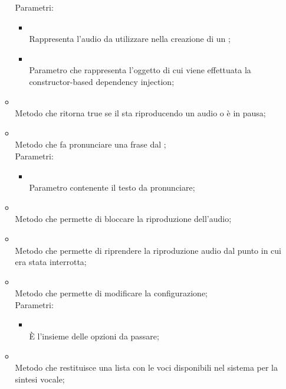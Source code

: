 \begin{itemize}
\begin{itemize}
		Parametri:
		\begin{itemize}
			\item {} \\
			Rappresenta l'audio da utilizzare nella creazione di un ;
			\item {} \\
			Parametro che rappresenta l'oggetto  di cui viene effettuata la constructor-based dependency injection;
		\end{itemize}
		\item[]  \\		Metodo che ritorna true se il  sta riproducendo un audio o è in pausa;\\
		\item[]  \\		Metodo che fa pronunciare una frase dal ;\\
		Parametri:
		\begin{itemize}
			\item {} \\
			Parametro contenente il testo da pronunciare;
		\end{itemize}
		\item[]  \\		Metodo che permette di bloccare la riproduzione dell'audio;\\
		\item[]  \\		Metodo che permette di riprendere la riproduzione audio dal punto in cui era stata interrotta;\\
		\item[]  \\		Metodo che permette di modificare la configurazione;\\
		Parametri:
		\begin{itemize}
			\item {} \\
			È l'insieme delle opzioni da passare;
		\end{itemize}
		\item[]  \\		Metodo che restituisce una lista con le voci disponibili nel sistema per la sintesi vocale;\\

\end{itemize}
\end{itemize}
